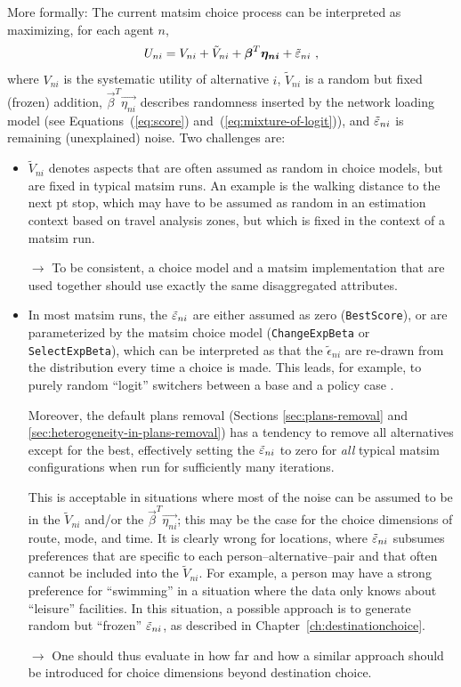 More formally: 
%
The current \gls{matsim} choice process can be interpreted as maximizing, for each agent $n$, 
\[
U_{ni} = V_{ni} + \tilde V_{ni} + \boldsymbol{\beta}^T \boldsymbol{\eta_{ni}} + \tilde {\varepsilon}_{ni} \ ,
\]
where 
%
$V_{ni}$ is the systematic utility of alternative $i$, 
%
$\tilde V_{ni}$ is a random but fixed (frozen) addition, 
%
$\vec{\beta}^T \vec{\eta_{ni}}$ describes randomness inserted by the network loading model (see Equations~(\ref{eq:score}) and~(\ref{eq:mixture-of-logit})), and $\tilde {\varepsilon}_{ni}$ is remaining (unexplained) noise.
%
Two challenges are:
\begin{itemize}

\item $\tilde V_{ni}$ denotes aspects that are often assumed as random in choice models, but are fixed in typical \gls{matsim} runs.  An example is the walking distance to the next \gls{pt} stop, which may have to be assumed as random in an estimation context based on travel analysis zones, but which is fixed in the context of a \gls{matsim} run.

$\to$ To be consistent, a choice model and a \gls{matsim} implementation that are used together should use exactly the same disaggregated attributes.

\item In most \gls{matsim} runs, the $\tilde{\varepsilon}_{ni}$ are either assumed as zero (\lstinline{BestScore}), or are parameterized by the \gls{matsim} choice model (\lstinline{ChangeExpBeta} or \lstinline{SelectExpBeta}), which can be interpreted as that the $\tilde\epsilon_{ni}$ are re-drawn from the distribution every time a choice is made.  This leads, for example, to purely random ``logit'' switchers between a base and a policy case \citep[e.g.][]{GretherEtAl2010TrbIncomeInTRR}.

Moreover, the default plans removal (Sections \ref{sec:plans-removal} and \ref{sec:heterogeneity-in-plans-removal}) has a tendency to remove all alternatives except for the best, effectively setting the $\tilde{\varepsilon}_{ni}$ to zero for \emph{all} typical \gls{matsim} configurations when run for sufficiently many iterations.

This is acceptable in situations where most of the noise can be assumed to be in the $\tilde V_{ni}$ and/or the $\vec{\beta}^T \vec{\eta_{ni}}$; this may be the case for the choice dimensions of route, mode, and time.  It is clearly wrong for locations, where $\tilde{\varepsilon}_{ni}$ subsumes preferences that are specific to each person--alternative--pair and that often cannot be included into the $\tilde V_{ni}$.  For example, a person may have a strong preference for ``swimming'' in a situation where the data only knows about ``leisure'' facilities.  In this situation, a possible approach is to generate random but ``frozen'' $\tilde{\varepsilon}_{ni}$, as described in Chapter~\ref{ch:destinationchoice}.

$\to$ One should thus evaluate in how far and how a similar approach should be introduced for choice dimensions beyond destination choice.

\end{itemize}

